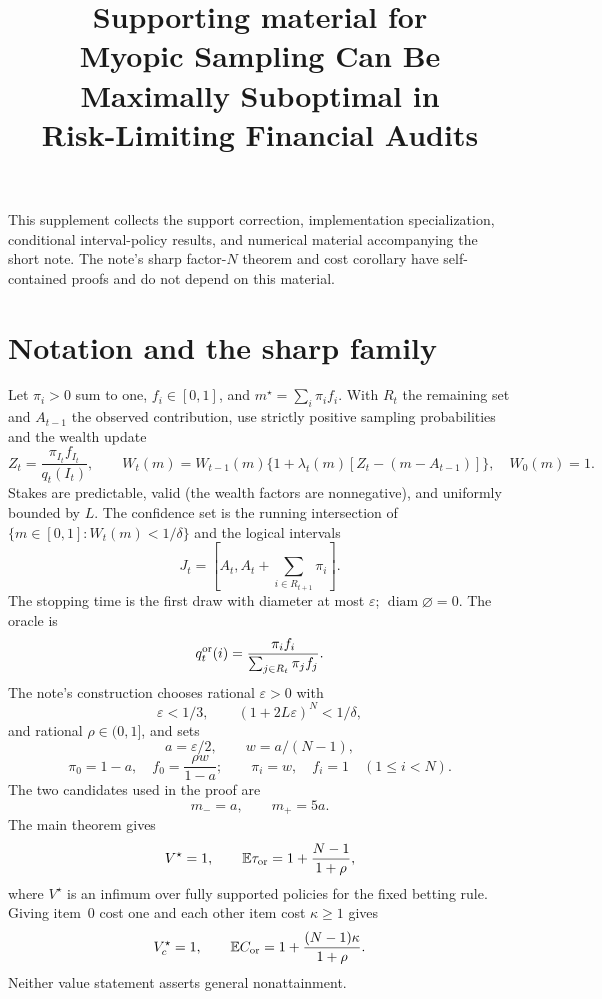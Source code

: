 \documentclass[11pt]{article}
\title{Supporting material for\\Myopic Sampling Can Be Maximally Suboptimal in\\Risk-Limiting Financial Audits}
\author{}
\date{}
\newcommand{\E}{\mathbb{E}}
\begin{document}
\maketitle
This supplement collects the support correction, implementation specialization,
conditional interval-policy results, and numerical material accompanying the
short note. The note's sharp factor-$N$ theorem and cost corollary have
self-contained proofs and do not depend on this material.

\section{Notation and the sharp family}
Let $\pi_i>0$ sum to one, $f_i\in[0,1]$, and $m^\star=\sum_i\pi_i f_i$.
With $R_t$ the remaining set and $A_{t-1}$ the observed contribution, use
strictly positive sampling probabilities and the wealth update
\begin{equation}\label{supp:2}
Z_t=\frac{\pi_{I_t}f_{I_t}}{q_t(I_t)},\qquad
W_t(m)=W_{t-1}(m)\{1+\lambda_t(m)[Z_t-(m-A_{t-1})]\},\quad W_0(m)=1.
\end{equation}
Stakes are predictable, valid (the wealth factors are nonnegative), and
uniformly bounded by $L$. The confidence set is the running intersection of
$\{m\in[0,1]:W_t(m)<1/\delta\}$ and the logical intervals
\begin{equation}\label{supp:3}
J_t=\left[A_t,A_t+\sum_{i\in R_{t+1}}\pi_i\right].
\end{equation}
The stopping time is the first draw with diameter at most $\varepsilon$;
$\operatorname{diam}\varnothing=0$. The oracle is
\begin{equation}\label{supp:1}
q_t^{\rm or}(i)=\frac{\pi_i f_i}{\sum_{j\in R_t}\pi_j f_j}.
\end{equation}
The note's construction chooses rational $\varepsilon>0$ with
\begin{equation}\label{supp:8}
\varepsilon<1/3,\qquad(1+2L\varepsilon)^N<1/\delta,
\end{equation}
and rational $\rho\in(0,1]$, and sets
\begin{equation}\label{supp:9}
a=\varepsilon/2,\qquad w=a/(N-1),
\end{equation}
\begin{equation}\label{supp:10}
\pi_0=1-a,\quad f_0=\frac{\rho w}{1-a};\qquad
\pi_i=w,\quad f_i=1\quad(1\le i<N).
\end{equation}
The two candidates used in the proof are
\begin{equation}\label{supp:11}
m_-=a,\qquad m_+=5a.
\end{equation}
The main theorem gives
\begin{equation}\label{supp:14}
V^\star=1,\qquad \E\tau_{\rm or}=1+\frac{N-1}{1+\rho},
\end{equation}
where $V^\star$ is an infimum over fully supported policies for the fixed
betting rule. Giving item~0 cost one and each other item cost $\kappa\ge1$
gives
\begin{equation}\label{supp:16}
V_c^\star=1,\qquad \E C_{\rm or}=1+\frac{(N-1)\kappa}{1+\rho}.
\end{equation}
Neither value statement asserts general nonattainment.
\end{document}
